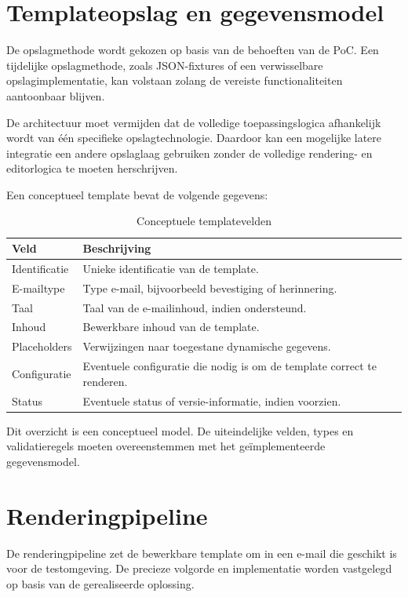 \section{Templateopslag en gegevensmodel}
De opslagmethode wordt gekozen op basis van de behoeften van de PoC.
Een tijdelijke opslagmethode, zoals JSON-fixtures of een verwisselbare
opslagimplementatie, kan volstaan zolang de vereiste functionaliteiten
aantoonbaar blijven.

De architectuur moet vermijden dat de volledige toepassingslogica afhankelijk
wordt van één specifieke opslagtechnologie. Daardoor kan een mogelijke
latere integratie een andere opslaglaag gebruiken zonder de volledige
rendering- en editorlogica te moeten herschrijven.

Een conceptueel template bevat de volgende gegevens:

\begin{table}[htbp]
    \centering
    \caption{Conceptuele templatevelden}
    \label{tab:templatevelden}
    \begin{tabular}{|p{3.5cm}|p{9cm}|}
        \hline
        \textbf{Veld} & \textbf{Beschrijving} \\
        \hline
        Identificatie & Unieke identificatie van de template. \\
        \hline
        E-mailtype & Type e-mail, bijvoorbeeld bevestiging of herinnering. \\
        \hline
        Taal & Taal van de e-mailinhoud, indien ondersteund. \\
        \hline
        Inhoud & Bewerkbare inhoud van de template. \\
        \hline
        Placeholders & Verwijzingen naar toegestane dynamische gegevens. \\
        \hline
        Configuratie & Eventuele configuratie die nodig is om de template
        correct te renderen. \\
        \hline
        Status & Eventuele status of versie-informatie, indien voorzien. \\
        \hline
    \end{tabular}
\end{table}

Dit overzicht is een conceptueel model. De uiteindelijke velden, types en
validatieregels moeten overeenstemmen met het geïmplementeerde gegevensmodel.

\section{Renderingpipeline}
De renderingpipeline zet de bewerkbare template om in een e-mail die geschikt
is voor de testomgeving. De precieze volgorde en implementatie worden
vastgelegd op basis van de gerealiseerde oplossing.

